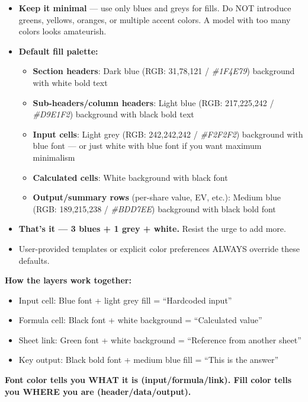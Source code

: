 \documentclass[11pt]{article}
\begin{document}
\begin{itemize}[leftmargin=*,itemsep=2pt,topsep=2pt]
\item {} \textbf{Keep it minimal} — use only blues and greys for fills. Do NOT introduce greens, yellows, oranges, or multiple accent colors. A model with too many colors looks amateurish.
\item {} \textbf{Default fill palette:}
\begin{itemize}[leftmargin=*,itemsep=2pt,topsep=2pt]
\item {} \textbf{Section headers}: Dark blue (RGB: 31,78,121 / \emph{\#1F4E79}) background with white bold text
\item {} \textbf{Sub-headers/column headers}: Light blue (RGB: 217,225,242 / \emph{\#D9E1F2}) background with black bold text
\item {} \textbf{Input cells}: Light grey (RGB: 242,242,242 / \emph{\#F2F2F2}) background with blue font — or just white with blue font if you want maximum minimalism
\item {} \textbf{Calculated cells}: White background with black font
\item {} \textbf{Output/summary rows} (per-share value, EV, etc.): Medium blue (RGB: 189,215,238 / \emph{\#BDD7EE}) background with black bold font
\end{itemize}
\item {} \textbf{That's it — 3 blues + 1 grey + white.} Resist the urge to add more.
\item {} User-provided templates or explicit color preferences ALWAYS override these defaults.
\end{itemize}

\textbf{How the layers work together:}

\begin{itemize}[leftmargin=*,itemsep=2pt,topsep=2pt]
\item {} Input cell: Blue font + light grey fill = ``Hardcoded input''
\item {} Formula cell: Black font + white background = ``Calculated value''
\item {} Sheet link: Green font + white background = ``Reference from another sheet''
\item {} Key output: Black bold font + medium blue fill = ``This is the answer''
\end{itemize}

\textbf{Font color tells you WHAT it is (input/formula/link). Fill color tells you WHERE you are (header/data/output).}
\end{document}
